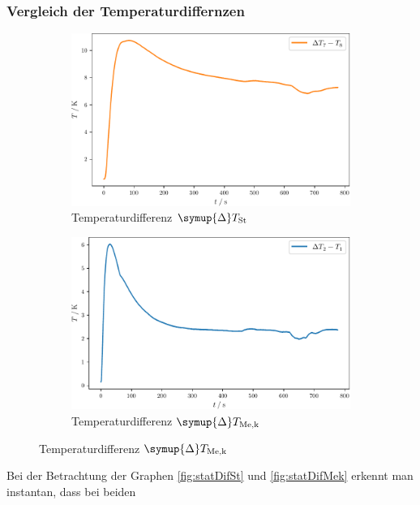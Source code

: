 \subsubsection{Vergleich der Temperaturdiffernzen}
\begin{figure}
  \begin{subfigure}{0.48\textwidth}
    \centering
    \includegraphics[width = \textwidth]{build/statDifSt.pdf}
    \caption{Temperaturdifferenz $\symup{\Delta}T_\text{St}$}
    \label{fig:statDifSt}
  \end{subfigure}
  \begin{subfigure}{0.48\textwidth}
    \centering
    \includegraphics[width = \textwidth]{build/statDifMek.pdf}
    \caption{Temperaturdifferenz $\symup{\Delta}T_\text{Me,k}$}
    \label{fig:statDifMek}
  \end{subfigure}
\end{figure}
Bei der Betrachtung der Graphen \eqref{fig:statDifSt} und \eqref{fig:statDifMek} erkennt man instantan, dass bei beiden
